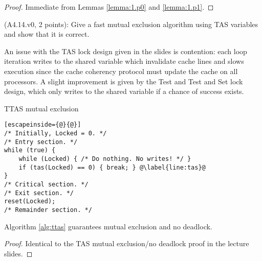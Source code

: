 \begin{proof}
Immediate from Lemmas \ref{lemma:1.p0} and \ref{lemma:1.p1}.
\end{proof}


\begin{Exc}{(A4.14.v0, 2 points):}
Give a fast mutual exclusion algorithm using TAS variables and
show that it is correct.
\end{Exc}

An issue with the TAS lock design given in the slides is contention:
each loop iteration writes to the shared variable which invalidate cache lines
and slows execution since the cache coherency protocol must update the cache
on all processors. A slight improvement is given by the Test and Test and Set
lock design, which only writes to the shared variable if a chance of success
exists.

\begin{algorithm}
\caption{TTAS mutual exclusion} \label{alg:ttas}
\begin{lstlisting}[escapeinside={@}{@}]
/* Initially, Locked = 0. */
/* Entry section. */
while (true) {
    while (Locked) { /* Do nothing. No writes! */ }
    if (tas(Locked) == 0) { break; } @\label{line:tas}@
}
/* Critical section. */
/* Exit section. */
reset(Locked);
/* Remainder section. */
\end{lstlisting}
\end{algorithm}

\begin{theorem}
Algorithm \ref{alg:ttas} guarantees mutual exclusion and no deadlock.
\end{theorem}

\begin{proof}
Identical to the TAS mutual exclusion/no deadlock proof in the lecture slides.
\end{proof}


\newcommand{\last}[1]{#1.\mathit{last}}
\newcommand{\first}[1]{#1.\mathit{first}}
\newcommand{\VV}[1]{\langle #1 \rangle}
\newcommand{\pos}{\mathit{pos}}
\newcommand{\queue}{\mathit{queue}}
\newcommand{\RMW}{\mathit{RMW}}

